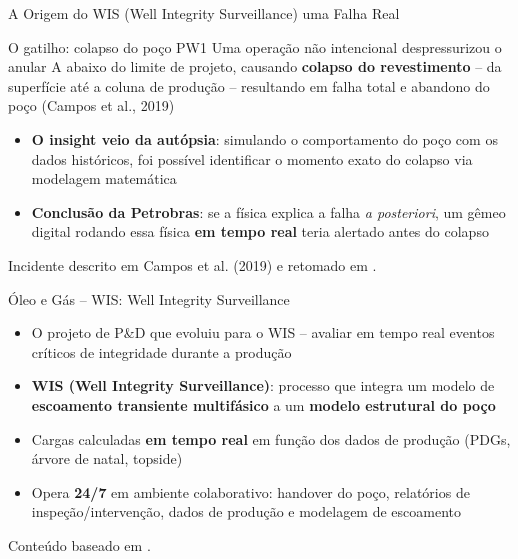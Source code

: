 \documentclass[aspectratio=169,xcolor=dvipsnames]{beamer}
\begin{document}
\begin{frame}{A Origem do WIS (Well Integrity Surveillance) uma Falha Real}
    \begin{alertblock}{O gatilho: colapso do poço PW1}
        Uma operação não intencional despressurizou o anular A abaixo do limite de projeto, causando \textbf{colapso do revestimento} -- da superfície até a coluna de produção -- resultando em falha total e abandono do poço (Campos et al., 2019)
    \end{alertblock}
    \begin{itemize}
        \item \textbf{O insight veio da autópsia}: simulando o comportamento do poço com os dados históricos, foi possível identificar o momento exato do colapso via modelagem matemática
        \item \textbf{Conclusão da Petrobras}: se a física explica a falha \textit{a posteriori}, um gêmeo digital rodando essa física \textbf{em tempo real} teria alertado antes do colapso
    \end{itemize}

    \vfill
    \footnotesize Incidente descrito em Campos et al. (2019) e retomado em \cite{otc2020}.
\end{frame}


\begin{frame}{Óleo e Gás -- WIS: Well Integrity Surveillance}
    \footnotesize
    \begin{itemize}
    \item O projeto de P\&D que evoluiu para o WIS -- avaliar em tempo real eventos críticos de integridade durante a produção
        \item \textbf{WIS (Well Integrity Surveillance)}: processo que integra um modelo de \textbf{escoamento transiente multifásico}  a um \textbf{modelo estrutural do poço} 
        \item Cargas calculadas \textbf{em tempo real} em função dos dados de produção (PDGs, árvore de natal, topside)
        \item Opera \textbf{24/7} em ambiente colaborativo: handover do poço, relatórios de inspeção/intervenção, dados de produção e modelagem de escoamento
    \end{itemize}
    
    \vfill
    \footnotesize Conteúdo baseado em \cite{spe210260,otc2020}.
\end{frame}
\end{document}
